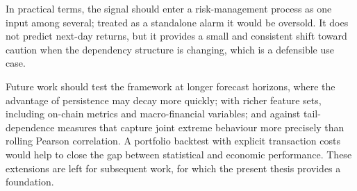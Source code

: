In practical terms, the signal should enter a risk-management process as one input among several; treated as a standalone alarm it would be oversold. It does not predict next-day returns, but it provides a small and consistent shift toward caution when the dependency structure is changing, which is a defensible use case.

Future work should test the framework at longer forecast horizons, where the advantage of persistence may decay more quickly; with richer feature sets, including on-chain metrics and macro-financial variables; and against tail-dependence measures that capture joint extreme behaviour more precisely than rolling Pearson correlation. A portfolio backtest with explicit transaction costs would help to close the gap between statistical and economic performance. These extensions are left for subsequent work, for which the present thesis provides a foundation.
